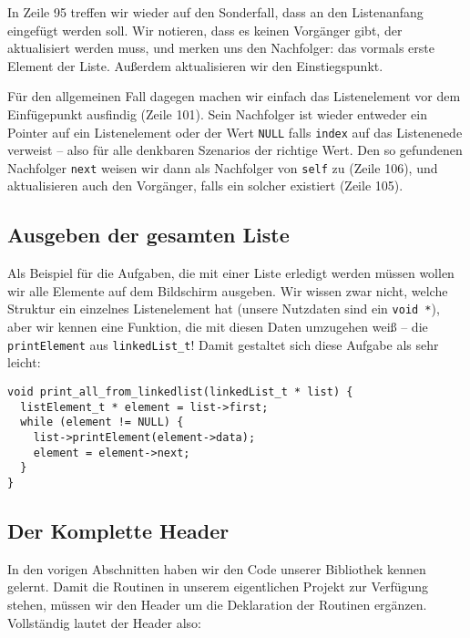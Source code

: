 In Zeile 95 treffen wir wieder auf den Sonderfall, dass an den Listenanfang eingefügt werden soll. Wir notieren, dass es keinen Vorgänger gibt, der aktualisiert werden muss, und merken uns den Nachfolger: das vormals erste Element der Liste. Außerdem aktualisieren wir den Einstiegspunkt.

Für den allgemeinen Fall dagegen machen wir einfach das Listenelement vor dem Einfügepunkt ausfindig (Zeile 101). Sein Nachfolger ist wieder entweder ein Pointer auf ein Listenelement oder der Wert \texttt{NULL} falls \texttt{index} auf das Listenenede verweist -- also für alle denkbaren Szenarios der richtige Wert. Den so gefundenen Nachfolger \texttt{next} weisen wir dann als Nachfolger von \texttt{self} zu (Zeile 106), und aktualisieren auch den Vorgänger, falls ein solcher existiert (Zeile 105).

\subsection{Ausgeben der gesamten Liste}
Als Beispiel für die Aufgaben, die mit einer Liste erledigt werden müssen wollen wir alle Elemente auf dem Bildschirm ausgeben. Wir wissen zwar nicht, welche Struktur ein einzelnes Listenelement hat (unsere Nutzdaten sind ein \texttt{void *}), aber wir kennen eine Funktion, die mit diesen Daten umzugehen weiß -- die \texttt{printElement} aus \texttt{linkedList\_t}! Damit gestaltet sich diese Aufgabe als sehr leicht:

\begin{codebox}
\begin{verbatim}
void print_all_from_linkedlist(linkedList_t * list) {
  listElement_t * element = list->first;
  while (element != NULL) {
    list->printElement(element->data);
    element = element->next;
  }
}
\end{verbatim}
\end{codebox}

\subsection{Der Komplette Header}
In den vorigen Abschnitten haben wir den Code unserer Bibliothek kennen gelernt. Damit die Routinen in unserem eigentlichen Projekt zur Verfügung stehen, müssen wir den Header um die Deklaration der Routinen ergänzen. Vollständig lautet der Header also:

